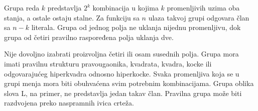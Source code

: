 
Grupa reda \(k\) predstavlja \(2^k\) kombinacija u kojima \(k\) promenljivih uzima oba stanja, a ostale ostaju stalne. Za funkciju sa \(n\) ulaza takvoj grupi odgovara član sa \(n-k\) literala. Grupa od jednog polja ne uklanja nijednu promenljivu, dok grupa od četiri pravilno raspoređena polja uklanja dve.

Nije dovoljno izabrati proizvoljna četiri ili osam susednih polja. Grupa mora imati pravilnu strukturu pravougaonika, kvadrata, kvadra, kocke ili odgovarajućeg hiperkvadra odnosno hiperkocke. Svaka promenljiva koja se u grupi menja mora biti obuhvaćena svim potrebnim kombinacijama. Grupa oblika slova L, na primer, ne predstavlja jedan takav član. Pravilna grupa može biti razdvojena preko naspramnih ivica crteža.
